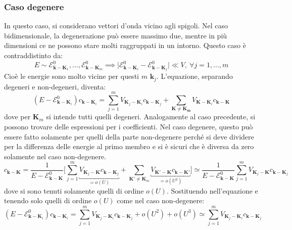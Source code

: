 \documentclass[10pt, a4paper]{scrartcl}
\numberwithin{equation}{subsection}
\theoremstyle{style1}
\theoremstyle{style2}
\begin{document}
\subsubsection{Caso degenere}

In questo caso, si considerano vettori d'onda vicino agli spigoli. Nel caso bidimensionale, la degenerazione pu\`o essere massimo due, mentre in pi\`u dimensioni ce ne possono stare molti raggruppati in un intorno. Questo caso \`e contraddistinto da:
\begin{equation}
	E \sim \mathscr{E}^0_{\mathbf{k} - \mathbf{K} _1} , \ldots, \mathscr{E}^0_{\mathbf{k} -\mathbf{K} _m} \implies \lvert \mathscr{E}^0_{\mathbf{k} - \mathbf{K} _i} - \mathscr{E}^0_{\mathbf{k} - \mathbf{K} _j}  \rvert \ll V ,  \ \forall j=1,\ldots,m  
\end{equation}
Cio\`e le energie sono molto vicine per questi $m$ $\mathbf{k} _j$. L'equazione, separando degeneri e non-degeneri, diventa:
\begin{equation}
	(E-\mathscr{E}^0_{\mathbf{k} -\mathbf{K} _i}) c_{\mathbf{k} -\mathbf{K} _i} = \sum_{j=1}^{m} V_{\mathbf{K} _j - \mathbf{K} _i} c_{\mathbf{k} -\mathbf{K} _j} + \sum_{\mathbf{K} \neq \mathbf{K_m} }^{} V_{\mathbf{K} -\mathbf{K} _i} c_{\mathbf{k} -\mathbf{K} } 
\end{equation}
dove per $\mathbf{K} _m$ si intende tutti quelli degeneri. Analogamente al caso precedente, si possono trovare delle espressioni per i coefficienti. Nel caso degenere, questo pu\`o essere fatto solamente per quelli della parte non-degenere perch\'e si deve dividere per la differenza delle energie al primo membro e si \`e sicuri che \`e diversa da zero solamente nel caso non-degenere.
\begin{equation}
	c_{\mathbf{k} -\mathbf{K} } = \frac{1}{E- \mathscr{E}^0_{\mathbf{k} - \mathbf{K} } } \Bigg[ \sum_{j=1}^{m}\underbracket{ V_{\mathbf{K} _j - \mathbf{K}} c_{\mathbf{k} -\mathbf{K} _j}}_{=o(U)}   + \sum_{\mathbf{K}' \neq \mathbf{K} _m}^{} \underbracket{V_{\mathbf{K} ' - \mathbf{K} } c_{\mathbf{k} -\mathbf{K} '} }_{= o(U^2)}   \Bigg] \simeq \frac{1}{E - \mathscr{E}^0_{\mathbf{k} - \mathbf{K} } } \sum_{j=1}^{m} V_{\mathbf{K} _j - \mathbf{K} } c_{\mathbf{k} - \mathbf{K} _j} 
\end{equation}
dove si sono tenuti solamente quelli di ordine $o(U)$. Sostituendo nell'equazione e tenendo solo quelli di ordine $o(U)$ come nel caso non-degenere:
\begin{equation}
	(E-\mathscr{E}^0_{\mathbf{k} - \mathbf{K} _i} ) c_{\mathbf{k} - \mathbf{K} _i} = \sum_{j=1}^{m} V_{\mathbf{K} _j - \mathbf{K} _i} c_{\mathbf{k} -\mathbf{K} _j} + o(U^2) + o(U^3) \simeq \sum_{j=1}^{m} V_{\mathbf{K} _j - \mathbf{K} _i} c_{\mathbf{k} -\mathbf{K} _j}
\end{equation}
\end{document}
